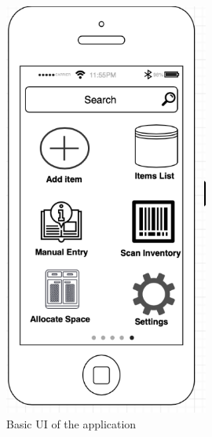 \begin{figure}[hbt!]
	\centering
   	\includegraphics[width=0.60\textwidth]{images/product.PNG}
    \caption{Basic UI of the application}
\end{figure}
